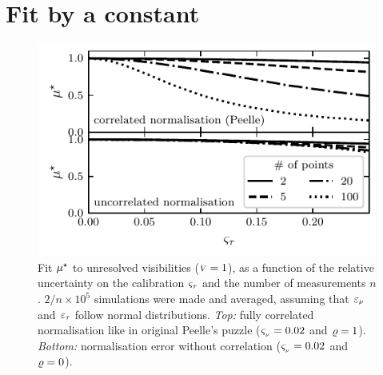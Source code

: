 \documentclass{pasa}
\begin{document}
\section{Fit by a constant}
\label{sec:single} 

\begin{figure}
\centering
\includegraphics[width=\linewidth]{pdf/uncorrelated-peelle.pdf}
\caption{Fit $\mu^\star$  to unresolved visibilities (${\scriptstyle V} = 1$), as a function of the relative uncertainty on the calibration $\varsigma_\tau$ and the number of measurements $n$. $2/n\times10^5$ simulations were made and averaged, assuming that $\varepsilon_\nu$ and $\varepsilon_\tau$ follow normal distributions. \textit{Top:} fully correlated normalisation like in original Peelle's puzzle ($\varsigma_{_\nu}=0.02$ and $\varrho = 1$). \textit{Bottom:} normalisation error without correlation ($\varsigma_{_\nu}=0.02$ and $\varrho = 0$).}
\label{fig:uncorr-peelle}
\end{figure}
\end{document}
